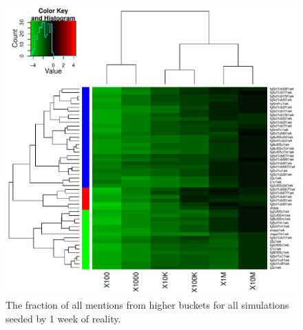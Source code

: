 \documentclass[10pt,oneside]{memoir}
\begin{document}
\begin{Spacing}{2}
\begin{figure}
\begin{center}
    \includegraphics{figures/crop/heatmap-b2bm-befr-rel-medians-log10-1wk}
    \caption{The fraction of all mentions from higher buckets for all simulations seeded by 1 week of reality.}
    \label{figure:heatmap-b2bm-befr-rel-medians-1wk}
\end{center}
\end{figure}


\end{Spacing}
\end{document}
